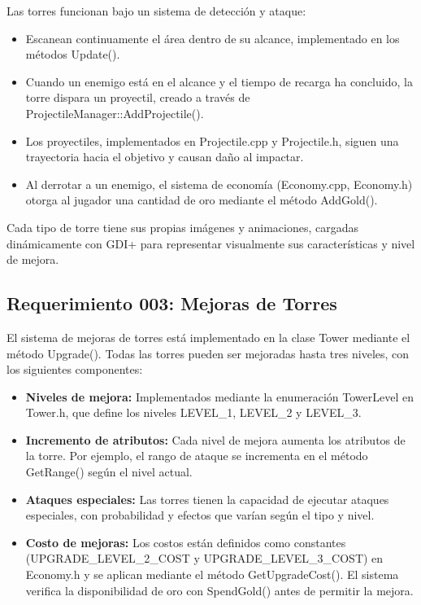 \documentclass[a4paper,num-refs]{oup-contemporary}
\begin{document}
Las torres funcionan bajo un sistema de detección y ataque:
\begin{itemize}
    \item Escanean continuamente el área dentro de su alcance, implementado en los métodos Update().
    \item Cuando un enemigo está en el alcance y el tiempo de recarga ha concluido, la torre dispara un proyectil, creado a través de ProjectileManager::AddProjectile().
    \item Los proyectiles, implementados en Projectile.cpp y Projectile.h, siguen una trayectoria hacia el objetivo y causan daño al impactar.
    \item Al derrotar a un enemigo, el sistema de economía (Economy.cpp, Economy.h) otorga al jugador una cantidad de oro mediante el método AddGold().
\end{itemize}

Cada tipo de torre tiene sus propias imágenes y animaciones, cargadas dinámicamente con GDI+ para representar visualmente sus características y nivel de mejora.

\subsection{Requerimiento 003: Mejoras de Torres}
El sistema de mejoras de torres está implementado en la clase Tower mediante el método Upgrade(). Todas las torres pueden ser mejoradas hasta tres niveles, con los siguientes componentes:

\begin{itemize}
    \item \textbf{Niveles de mejora:} Implementados mediante la enumeración TowerLevel en Tower.h, que define los niveles LEVEL_1, LEVEL_2 y LEVEL_3.
    \item \textbf{Incremento de atributos:} Cada nivel de mejora aumenta los atributos de la torre. Por ejemplo, el rango de ataque se incrementa en el método GetRange() según el nivel actual.
    \item \textbf{Ataques especiales:} Las torres tienen la capacidad de ejecutar ataques especiales, con probabilidad y efectos que varían según el tipo y nivel.
    \item \textbf{Costo de mejoras:} Los costos están definidos como constantes (UPGRADE_LEVEL_2_COST y UPGRADE_LEVEL_3_COST) en Economy.h y se aplican mediante el método GetUpgradeCost(). El sistema verifica la disponibilidad de oro con SpendGold() antes de permitir la mejora.
\end{itemize}
\end{document}
